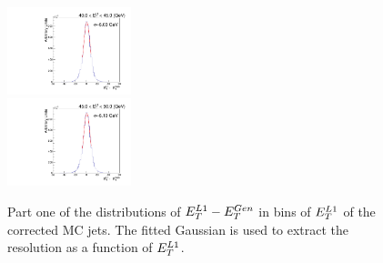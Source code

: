 \begin{figure}[h!]
          \includegraphics[width=0.32\textwidth]{detector/l1jet/gaussfits//ptBin_5_PtAll_pf.pdf}\\
          \includegraphics[width=0.32\textwidth]{detector/l1jet/gaussfits//ptBin_6_PtAll_pf.pdf}
    \caption{Part one of the distributions of $E_{T}^{L1}-E_{T}^{Gen}$ in bins of $E_{T}^{L1}$ of the corrected MC jets. 
	The fitted Gaussian is used to extract the resolution as a function of $E_{T}^{L1}$.}
    \label{fig:mcresfits_pf_p1}
\end{figure}
 
